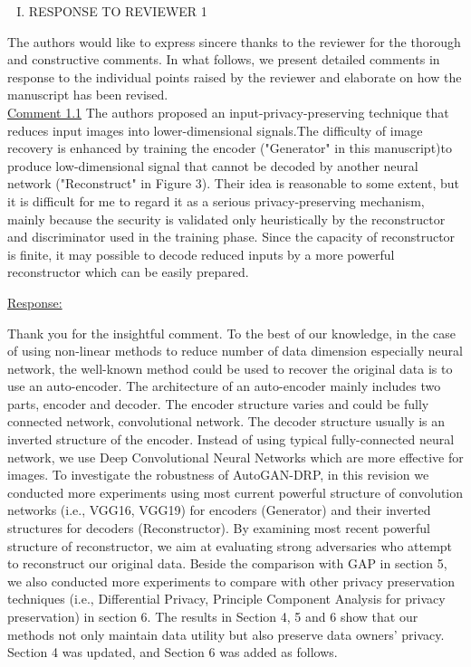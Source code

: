 \documentclass[]{elsarticle}
\begin{document}
\newpage
\begin{enumerate}[I.]
\item RESPONSE TO REVIEWER 1
\end{enumerate}

The authors would like to express sincere thanks to the reviewer for the thorough and constructive
comments. In what follows, we present detailed comments in response to the individual points raised by
the reviewer and elaborate on how the manuscript has been revised.\\


\color{blue}
\underline{Comment 1.1}
The authors proposed an input-privacy-preserving technique that reduces input images into lower-dimensional signals.The difficulty of image recovery is enhanced by training the encoder ("Generator" in this manuscript)to produce low-dimensional signal that cannot be decoded by another neural network ("Reconstruct" in Figure 3). Their idea is reasonable to some extent, but it is difficult for me to regard it as a serious privacy-preserving mechanism, mainly because the security is validated only heuristically by the reconstructor and discriminator used in the training phase. Since the capacity of reconstructor is finite, it may possible to decode reduced inputs by a more powerful reconstructor which can be easily prepared.

\color{black}
\underline{Response:}

Thank you for the insightful comment. To the best of our knowledge, in the case of using non-linear methods to reduce number of data dimension especially neural network, the well-known method could be used to recover the original data is to use an auto-encoder. The architecture of an auto-encoder mainly includes two parts, encoder and decoder. The encoder structure varies and could be fully connected network, convolutional network. The decoder structure usually is an inverted structure of the encoder. 
Instead of using typical fully-connected neural network, we use Deep Convolutional Neural Networks which are more effective for images. To investigate the robustness of AutoGAN-DRP, in this revision we conducted more experiments using most current powerful structure of convolution networks (i.e., VGG16, VGG19) for encoders (Generator) and their inverted structures for decoders (Reconstructor). By examining most recent powerful structure of reconstructor, we aim at evaluating strong adversaries who attempt to reconstruct our original data. Beside the comparison with GAP in section 5, we also conducted more experiments to compare with other privacy preservation techniques (i.e., Differential Privacy, Principle Component Analysis for privacy preservation) in section 6. The results in Section 4, 5 and 6 show that our methods not only maintain data utility but also preserve data owners' privacy. Section 4 was updated, and Section 6 was added as follows.\\
\end{document}
